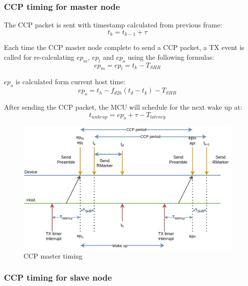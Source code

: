 \documentclass[\main/main.tex]{subfiles}
\begin{document}
\subsubsection{CCP timing for master node}

The CCP packet is sent with timestamp calculated from previous frame:
\begin{equation}
    t_k = t_{k-1} + \tau
\end{equation}

Each time the CCP master node complete to send a CCP packet, a TX event is called for re-calculating $ep_m$, $ep_l$ and $ep_o$ using the following formulas:
\begin{equation}
    ep_m = ep_l = t_k - T_{SHR}
\end{equation}

$ep_o$ is calculated form current host time:
\begin{equation}
    ep_o = t_h - f_{d2h}(t_d - t_k) - T_{SHR}
\end{equation}

After sending the CCP packet, the MCU will schedule for the next wake up at:
\begin{equation}
    t_{wake up} = ep_o + \tau - T_{latency}
\end{equation}

\begin{figure}[H]
    \begin{center}
        \includegraphics[scale=0.30]{ccp_timing_for_master_node.png}
    \end{center}
    \caption{CCP master timing}
    \label{fig:interupt_latency_master}
\end{figure}

\subsubsection{CCP timing for slave node}
\end{document}
